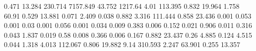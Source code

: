 0.471      13.284     %
230.714    7157.849   %
43.752     1217.64    %
4.01       113.395    %
0.832      19.964     %
1.758      60.91      %
0.529      13.881     %
0.071      2.409      %
0.038      0.882      %
3.316      111.444    %
0.858      23.436     %
0.001      0.053      %
0.001      0.03       %
0.001      0.056      %
0.001      0.034      %
0.009      0.383      %
0.006      0.152      %
0.021      0.906      %
0.011      0.316      %
0.043      1.837      %
0.019      0.58       %
0.008      0.366      %
0.006      0.167      %
0.882      23.437     %
0.26       4.885      %
0.124      4.515      %
0.044      1.318      %
4.013      112.067    %
0.806      19.882     %
9.14       310.593    %
2.247      63.901     %
0.255      13.357     %

